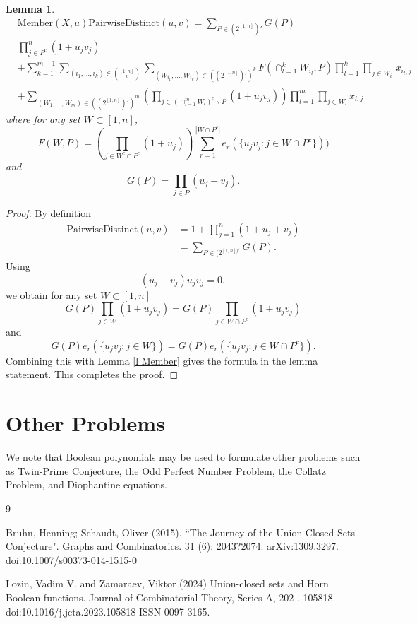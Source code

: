 \documentclass[11pt, oneside]{article}   	%
\newtheorem{lemma}{Lemma}
\begin{document}
\begin{lemma} 
\begin{align*}
&\mathrm{Member}(X,u)\mathrm{PairwiseDistinct}(u,v)  = \sum_{P \in (2^{[1,n]})'} G(P) \\ 
&\prod_{j \in P^c}^n (1+u_j v_j)\\ 
 &+\sum_{k=1}^{m-1} \sum_{(i_1, \ldots, i_k) \in {[1,n] \choose k}} \sum_{(W_{i_1}, \ldots, W_{i_k}) \in ((2^{[1,n]} )' )^k} F( \cap_{l=1}^k W_{i_l}, P)\prod_{l=1}^k   \prod_{j \in W_{i_l}} x_{i_l, j}\\ &+\sum_{(W_{1}, \ldots, W_{m}) \in ((2^{[1,n]} )' )^m} (\prod_{j \in (\cap_{l=1}^m W_l)^c \backslash P} (1+u_jv_j) )  \prod_{l=1}^m \prod_{j \in W_{l}} x_{l, j}\end{align*}
where for any set $W \subset [1,n]$, 
\[
 F(W,P)= (\prod_{j \in W^c \cap P^c} (1+u_j)  ) \sum_{r=1}^{|W \cap P^c|} e_r(\{ u_j v_j \colon j \in W \cap P^c\})) 
\]
and 
\[
G(P) = \prod_{j \in P} (u_j+v_j).
\]
\end{lemma}
\begin{proof} 
By definition 
\begin{align*}
\mathrm{PairwiseDistinct}(u,v) &= 1+\prod_{j=1}^n (1+u_j+v_{j}) \\ 
&= \sum_{P \in (2^{[1,n])'}} G(P).
\end{align*}
Using 
\[
(u_j+v_j)u_j v_j=0,
\]
we obtain for any set $W \subset [1,n]$
\[
G(P)\prod_{j \in W} (1+ u_j v_j) = G(P)\prod_{j \in W \cap P^c} (1+ u_j v_j) 
\]
and 
\[
G(P)e_r(\{ u_j v_j \colon j \in W\}) = G(P)e_r(\{ u_j v_j \colon j \in W \cap P^c\}).
\]
Combining this with Lemma \ref{l Member} gives the formula in the lemma statement. This completes the proof. 
\end{proof}

\section{Other Problems}

We note that Boolean polynomials may be used to formulate other problems such as Twin-Prime Conjecture, the Odd Perfect Number Problem, the Collatz Problem, and Diophantine equations. 


\begin{thebibliography}{9}

 Bruhn, Henning; Schaudt, Oliver (2015). ``The Journey of the Union-Closed Sets Conjecture". Graphs and Combinatorics. 31 (6): 2043?2074. arXiv:1309.3297. doi:10.1007/s00373-014-1515-0

 Lozin, Vadim V. and Zamaraev, Viktor (2024) Union-closed sets and Horn Boolean functions. Journal of Combinatorial Theory, Series A, 202 . 105818. doi:10.1016/j.jcta.2023.105818 ISSN 0097-3165.



\end{thebibliography}
\end{document}
